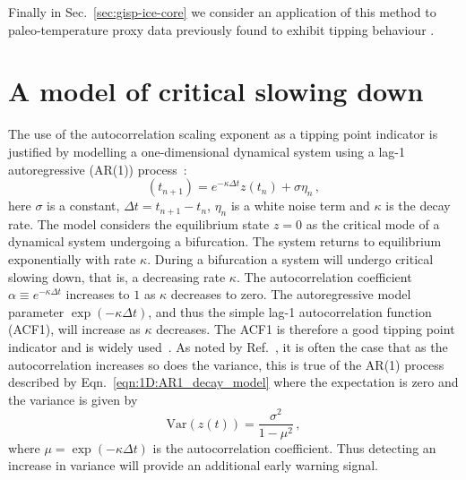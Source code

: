 \documentclass[10pt]{iopart}
\newcommand{\revision}[1]{}
\begin{document}
Finally in Sec.~\ref{sec:gisp-ice-core} we consider an application of this method to paleo-temperature proxy data previously found to exhibit tipping behaviour \cite{lenton2012climate}.

\section{A model of critical slowing down}
\label{sec:modellingCSD}

The use of the autocorrelation scaling exponent as a tipping point indicator is justified by modelling a one-dimensional dynamical system using a lag-1 autoregressive (AR(1)) process~\cite{held2004, scheffer2009}:
\begin{equation}
	\label{eqn:1D:AR1_decay_model}
	{\revision z(t_{n+1}) = e^{-\kappa\Delta t}z(t_{n}) + \sigma\eta_n \,, }
\end{equation}
{\revision where $\sigma$ is a constant, $\Delta t = t_{n+1} - t_n$, $\eta_n$ is a white noise term and $\kappa$ is the decay rate.} The model considers the equilibrium state $z=0$ as the critical mode of a dynamical system undergoing a bifurcation. The system returns to equilibrium exponentially with rate $\kappa$. During a bifurcation a system will undergo critical slowing down, that is, a decreasing rate $\kappa$. The autocorrelation coefficient $\alpha \equiv e^{-\kappa\Delta t}$ increases to $1$ as $\kappa$ decreases to zero. The autoregressive model parameter $\exp(-\kappa\Delta t)$, and thus the simple lag-1 autocorrelation function (ACF1), will increase as $\kappa$ decreases. The ACF1 is therefore a good tipping point indicator and is widely used~\cite{held2004,lenton2012}. As noted by Ref.~\cite{scheffer2009}, it is often the case that as the autocorrelation increases so does the variance, this is true of the AR(1) process described by Eqn.~\ref{eqn:1D:AR1_decay_model} where the expectation is zero and the variance is given by
\begin{equation}
	\textrm{Var}(z(t)) = \frac{\sigma^2}{1-\mu^2}\,,
\end{equation} 
where $\mu=\exp(-\kappa\Delta t)$ is the autocorrelation coefficient. Thus detecting an increase in variance will provide an additional early warning signal.
\end{document}
